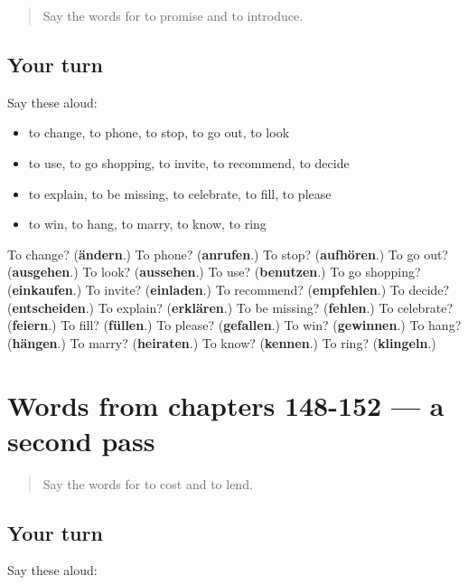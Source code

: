 \label{lesson:GE-R152-first-pass-words-from-chapters-144-147}



\begin{quote}
Say the words for to promise and to introduce.
\end{quote}

\subsection*{Your turn}
Say these aloud:

\begin{itemize}
\raggedright
  \item to change, to phone, to stop, to go out, to look
  \item to use, to go shopping, to invite, to recommend, to decide
  \item to explain, to be missing, to celebrate, to fill, to please
  \item to win, to hang, to marry, to know, to ring
\end{itemize}

\begin{tcolorbox}[breakable,colback=teal!4,colframe=teal!35!black,title={Before you move on}]
To change? (\textbf{ändern}.) To phone? (\textbf{anrufen}.) To stop? (\textbf{aufhören}.) To go out? (\textbf{ausgehen}.) To look? (\textbf{aussehen}.) To use? (\textbf{benutzen}.) To go shopping? (\textbf{einkaufen}.) To invite? (\textbf{einladen}.) To recommend? (\textbf{empfehlen}.) To decide? (\textbf{entscheiden}.) To explain? (\textbf{erklären}.) To be missing? (\textbf{fehlen}.) To celebrate? (\textbf{feiern}.) To fill? (\textbf{füllen}.) To please? (\textbf{gefallen}.) To win? (\textbf{gewinnen}.) To hang? (\textbf{hängen}.) To marry? (\textbf{heiraten}.) To know? (\textbf{kennen}.) To ring? (\textbf{klingeln}.)
\end{tcolorbox}
\section[(dialogue)]{Words from chapters 148-152 — a second pass}

\label{lesson:GE-R152-second-pass-words-from-chapters-148-152}



\begin{quote}
Say the words for to cost and to lend.
\end{quote}

\subsection*{Your turn}
Say these aloud:

